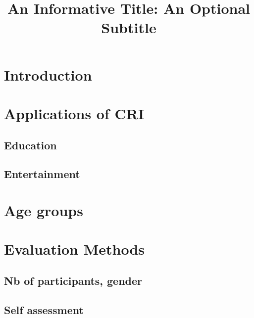 \documentclass[lettersize, apacite, twoside, HRI]{apa_HRI}
\title{An Informative Title: An Optional Subtitle}
\begin{document}
\maketitle

\section{Introduction}
\label{sec:introduction}




\section{Applications of CRI}


\subsection{Education}
\subsection{Entertainment}

\section{Age groups}

\section{Evaluation Methods}
\subsection{Nb of participants, gender}
\subsection{Self assessment }



\end{document}
